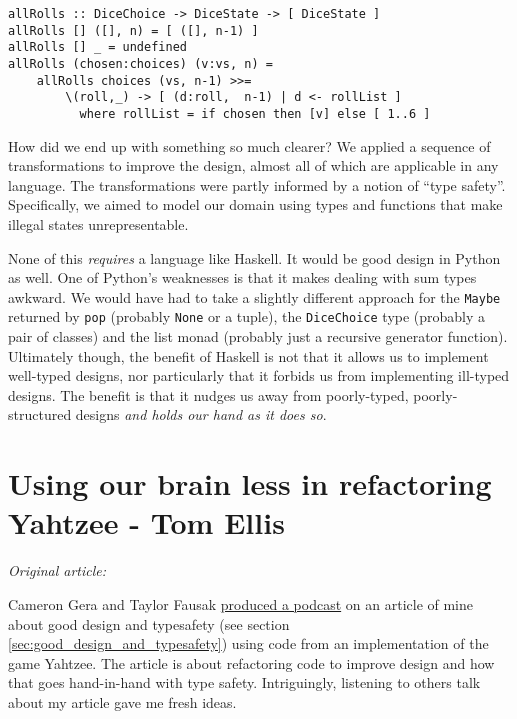 \begin{verbatim}
allRolls :: DiceChoice -> DiceState -> [ DiceState ]
allRolls [] ([], n) = [ ([], n-1) ]
allRolls [] _ = undefined
allRolls (chosen:choices) (v:vs, n) =
    allRolls choices (vs, n-1) >>=
        \(roll,_) -> [ (d:roll,  n-1) | d <- rollList ]
          where rollList = if chosen then [v] else [ 1..6 ]
\end{verbatim}
How did we end up with something so much clearer? We applied a sequence of transformations to improve the design, almost all of which are applicable in any language. The transformations were partly informed by a notion of ``type safety''. Specifically, we aimed to model our domain using types and functions that make illegal states unrepresentable.

None of this \textit{requires} a language like Haskell. It would be good design in Python as well. One of Python's weaknesses is that it makes dealing with sum types awkward. We would have had to take a slightly different approach for the \texttt{Maybe} returned by \texttt{pop} (probably \texttt{None} or a tuple), the \texttt{DiceChoice} type (probably a pair of classes) and the list monad (probably just a recursive generator function). Ultimately though, the benefit of Haskell is not that it allows us to implement well-typed designs, nor particularly that it forbids us from implementing ill-typed designs. The benefit is that it nudges us away from poorly-typed, poorly-structured designs \textit{and holds our hand as it does so}.








\chapter{Using our brain less in refactoring Yahtzee - Tom Ellis}

\textit{Original article: \cite{using_our_brain_less}}

\vspace{\baselineskip}

\noindent Cameron Gera and Taylor Fausak \href{https://haskellweekly.news/episode/22.html}{produced a podcast} on an article of mine about good design and typesafety (see section \ref{sec:good_design_and_typesafety}) using code from an implementation of the game Yahtzee. The article is about refactoring code to improve design and how that goes hand-in-hand with type safety. Intriguingly, listening to others talk about my article gave me fresh ideas.

